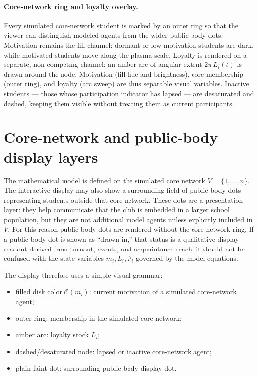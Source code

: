 \documentclass[11pt]{article}
\begin{document}
\paragraph{Core-network ring and loyalty overlay.}
Every simulated core-network student is marked by an outer ring so that the viewer can distinguish
modeled agents from the wider public-body dots. Motivation remains the fill channel: dormant or
low-motivation students are dark, while motivated students move along the plasma scale. Loyalty is
rendered on a separate, non-competing channel: an amber arc of angular extent $2\pi\,L_i(t)$ is drawn
around the node. Motivation (fill hue and brightness), core membership (outer ring), and loyalty
(arc sweep) are thus separable visual variables. Inactive students --- those whose participation
indicator has lapsed --- are desaturated and dashed, keeping them visible without treating them as
current participants.


\section{Core-network and public-body display layers}

The mathematical model is defined on the simulated core network $V=\{1,\dots,n\}$. The interactive
display may also show a surrounding field of public-body dots representing students outside that core
network. These dots are a presentation layer: they help communicate that the club is embedded in a
larger school population, but they are not additional model agents unless explicitly included in $V$.
For this reason public-body dots are rendered without the core-network ring. If a public-body dot is
shown as ``drawn in,'' that status is a qualitative display readout derived from turnout, events, and
acquaintance reach; it should not be confused with the state variables $m_i,L_i,F_i$ governed by the
model equations.

The display therefore uses a simple visual grammar:
\begin{itemize}
  \item filled disk color $\mathcal{C}(m_i)$: current motivation of a simulated core-network agent;
  \item outer ring: membership in the simulated core network;
  \item amber arc: loyalty stock $L_i$;
  \item dashed/desaturated node: lapsed or inactive core-network agent;
  \item plain faint dot: surrounding public-body display dot.
\end{itemize}
\end{document}
